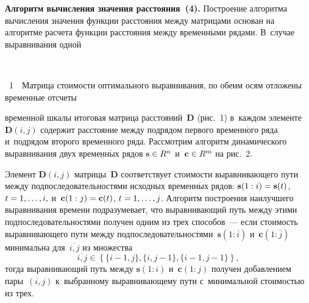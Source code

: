 \begin{multicols}{2}
\textbf{Алгоритм вычисления значения расстояния~(4).}
Построение алгоритма вычисления значения функции расстояния 
между матрицами основан на алгоритме расчета функции расстояния 
между временн$\acute{\mbox{ы}}$ми рядами. В~случае выравнивания одной\linebreak\vspace*{-12pt}

{ \begin{center}  %
 \vspace*{-3pt}
    \mbox{%
 \epsfxsize=79mm 
 }


\end{center}


\noindent
{{\figurename~1}\ \ \small{Матрица стоимости оптимального выравнивания, по обеим 
осям отложены временные отсчеты}}
}

\vspace*{12pt}


\noindent 
временн$\acute{\mbox{о}}$й шкалы
 итоговая матрица расстояний~$\boldsymbol{D}$ (рис.~1) в~каждом 
 элементе~$\boldsymbol{D}(i,j)$ содержит рас\-сто\-яние между подрядом 
 первого временн$\acute{\mbox{о}}$го ряда и~подрядом второго временн$\acute{\mbox{о}}$го ряда. 
 Рас\-смот\-рим алгоритм динамического выравнивания двух временн$\acute{\mbox{ы}}$х 
 рядов $\textbf{s} \hm\in R^n$ и~$\textbf{c} \hm\in R^m$ на рис.~2.
 
 

Элемент $\boldsymbol{D}(i,j)$ матрицы~$\boldsymbol{D}$ соответствует 
стоимости выравнивающего пути между подпоследовательностями 
исходных временн$\acute{\mbox{ы}}$х рядов: $\textbf{s}(1:i) \hm= \textbf{s}(t)$, 
$t \hm= 1,\ldots,i,$ и~$\textbf{c}(1:j) \hm= \textbf{c}(t)$, $t \hm= 1,\ldots,j$. 
Алгоритм построения наилучшего выравнивания времени 
подразумевает, что выравнивающий путь между этими 
подпоследовательностями получен одним из трех способов~--- 
если стоимость выравнивающего пути между 
подпоследовательностями~$\textbf{s}(1:\overline{i}) $ 
и~$\textbf{c}(1:\overline{j})$ минимальна для~$\overline{i,j}$ из множества
$$
\overline{i,j} \in \left\{ \{i-1,j\},\{i,j-1\},\{i-1,j-1\} \right\},$$
тогда выравнивающий путь между $\textbf{s}(1:i)$ и~$\textbf{c}(1:j)$ получен добавлением пары~$(i,j)$ к~выбранному 
выравнивающему пути с~минимальной стоимостью из трех.




\end{multicols}
